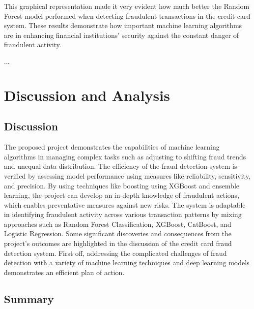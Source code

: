 This graphical representation made it very evident how much better the Random Forest model performed when detecting fraudulent transactions in the credit card system. These results demonstrate how important machine learning algorithms are in enhancing financial institutions' security against the constant danger of fraudulent activity. 


...





\section{Discussion and Analysis}

\subsection{Discussion}
The proposed project demonstrates the capabilities of machine learning algorithms in managing complex tasks such as adjusting to shifting fraud trends and unequal data distribution. The efficiency of the fraud detection system is verified by assessing model performance using measures like reliability, sensitivity, and precision. By using techniques like boosting using XGBoost and ensemble learning, the project can develop an in-depth knowledge of fraudulent actions, which enables preventative measures against new risks. 
The system is adaptable in identifying fraudulent activity across various transaction patterns by mixing approaches such as Random Forest Classification, XGBoost, CatBoost, and Logistic Regression. Some significant discoveries and consequences from the project's outcomes are highlighted in the discussion of the credit card fraud detection system. First off, addressing the complicated challenges of fraud detection with a variety of machine learning techniques and deep learning models demonstrates an efficient plan of action.

\subsection{Summary}

